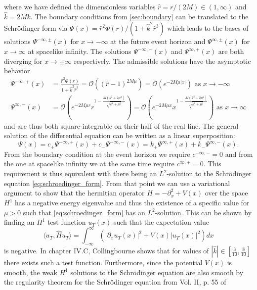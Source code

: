 \documentclass[11pt,aip,jmp,amsmath,amssymb,draft]{revtex4-1}
\begin{document}
where we have defined the dimensionless variables $\hat r = r/(2M) \in (1,\infty)$ and $\hat k = 2Mk$. 
The boundary conditions from \cref{sec:boundary} can be translated to the Schr{\"o}dinger form via $\Psi(x) = \hat{r}^2\Phi(r)/(1+ \hat k^2 \hat r^3)$ which leads to the bases of solutions $\Psi^{-\infty,\pm}(x)$ for $x\to -\infty$ at the future event horizon and $\Psi^{\infty,\pm}(x)$ for $x\to \infty$ at spacelike infinity. 
The solutions $\Psi^{-\infty,-}(x)$ and $\Psi^{\infty,+}(x)$ are both diverging for $x\to \pm \infty$ respectively. The admissible solutions have the asymptotic behavior
\begin{align}
    \Psi^{-\infty,+}(x) &= \frac{\hat{r}^2\Phi(r)}{1+ \hat k^2 \hat r^3} = \mathcal{O}\left((\hat r - 1)^{2M\mu}\right) = \mathcal{O}(e^{-2M\mu |x|}) \text{ as } x\to -\infty\\
    \Psi^{\infty,-}(x) &= \mathcal{O}\left(e^{-2M\mu r}r^{1-\frac{M(k^2 + 2\mu^2)}{\sqrt{k^2 + \mu^2}}}\right) = \mathcal{O}\left(e^{-2M\mu x}x^{1-\frac{M(k^2 + 2\mu^2)}{\sqrt{k^2 + \mu^2}}}\right) \text{ as } x\to \infty 
\end{align}
and are thus both square-integrable on their half of the real line.
The general solution of the differential equation can be written as a linear superposition:
\begin{equation}
    \Psi(x) = c_{+} \Psi^{-\infty,+}(x) + c_{-}\Psi^{-\infty,-}(x) = k_{+} \Psi^{\infty,+}(x) + k_{-}\Psi^{\infty,-}(x).
\end{equation}
From the boundary condition at the event horizon we require $c^{-\infty,-} = 0$ and from the one at spacelike infinity we at the same time require $c^{\infty,+} = 0$. This requirement is thus equivalent with there being an $L^2$-solution to the Schr{\"o}dinger equation \cref{eq:schroedinger_form}. 
From that point we can use a variational argument to show that the hermitian operator $\hat H = -\partial_x^2 + V(x)$ over the space $H^1$ has a negative energy eigenvalue and thus the existence of a specific value for $\mu>0$ such that \cref{eq:schroedinger_form} has an $L^2$-solution. 
This can be shown by finding an $H^1$ test function $u_T(x)$ such that the expectation value
\begin{equation} \label{eq:expectation_value}
    \langle u_T , \hat H u_T \rangle = \int_{-\infty}^\infty \left( |\partial_x u_T(x)|^2 + V(x) |u_T(x)|^2\right)dx
\end{equation}
is negative. In chapter IV.C, Collingbourne \cite{collingbourne2021gregory} shows that for values of $|\hat k| \in \left[\frac{3}{10}, \frac{8}{10}\right]$ there exists such a test function. 
Furthermore, since the potential $V(x)$ is smooth, the weak $H^1$ solutions to the Schr{\"o}dinger equation are also smooth by the regularity theorem for the Schr{\"o}dinger equation from Vol. II, p. 55 of \cite{reed1975ii}
\end{document}
